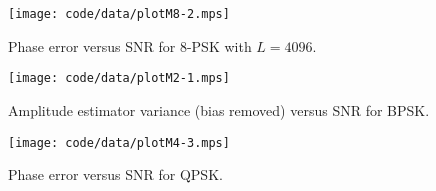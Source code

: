 \documentclass[draftcls, onecolumn, 11pt]{IEEEtran}
\begin{document}
\begin{figure}[p]
	\centering
		\texttt{[image: code/data/plotM8-2.mps]}
		\caption{Phase error versus SNR for $8$-PSK with $L=4096$.}
		\label{fig:plotphase8PSK}
\end{figure}



\begin{figure}[tp]
	\centering
		\texttt{[image: code/data/plotM2-1.mps]}
		\caption{Amplitude estimator variance (bias removed) versus SNR for BPSK.}
		\label{fig:plotampBPSK}
\end{figure}




\begin{figure}[tp]
	\centering
		\texttt{[image: code/data/plotM4-3.mps]}
		\caption{Phase error versus SNR for QPSK.}
		\label{fig:plotphaseQPSKmultL}
\end{figure}


\end{document}
